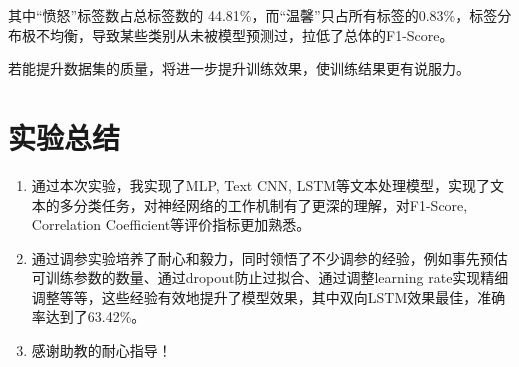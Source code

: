 \documentclass[12pt,a4paper]{article}
\begin{document}
\begin{itemize}
    其中“愤怒”标签数占总标签数的 44.81\%，而“温馨”只占所有标签的0.83\%，标签分布极不均衡，导致某些类别从未被模型预测过，拉低了总体的F1-Score。

\end{itemize}

若能提升数据集的质量，将进一步提升训练效果，使训练结果更有说服力。

\newpage

\section{实验总结}

\begin{enumerate}
\def\labelenumi{\arabic{enumi}.}
\item
  通过本次实验，我实现了MLP, Text CNN,
  LSTM等文本处理模型，实现了文本的多分类任务，对神经网络的工作机制有了更深的理解，对F1-Score, Correlation Coefficient等评价指标更加熟悉。
\item
  通过调参实验培养了耐心和毅力，同时领悟了不少调参的经验，例如事先预估可训练参数的数量、通过dropout防止过拟合、通过调整learning
  rate实现精细调整等等，这些经验有效地提升了模型效果，其中双向LSTM效果最佳，准确率达到了63.42\%。
\item
  感谢助教的耐心指导！
\end{enumerate}
\end{document}
